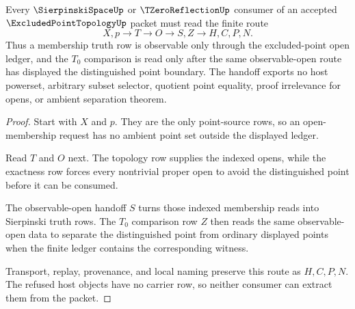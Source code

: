 \begin{theorem}
\label{thm:excluded-point-topology-sierpinski-handoff}
Every $\SierpinskiSpaceUp$ or $\TZeroReflectionUp$ consumer of an accepted $\ExcludedPointTopologyUp$ packet must read the finite route
$$
X,p \longrightarrow T \longrightarrow O \longrightarrow S,Z \longrightarrow H,C,P,N .
$$
Thus a membership truth row is observable only through the excluded-point open ledger, and the $T_0$ comparison is read only after the same observable-open route has displayed the distinguished point boundary. The handoff exports no host powerset, arbitrary subset selector, quotient point equality, proof irrelevance for opens, or ambient separation theorem.
\end{theorem}
\begin{proof}
Start with $X$ and $p$. They are the only point-source rows, so an open-membership request has no ambient point set outside the displayed ledger.

Read $T$ and $O$ next. The topology row supplies the indexed opens, while the exactness row forces every nontrivial proper open to avoid the distinguished point before it can be consumed.

The observable-open handoff $S$ turns those indexed membership reads into Sierpinski truth rows. The $T_0$ comparison row $Z$ then reads the same observable-open data to separate the distinguished point from ordinary displayed points when the finite ledger contains the corresponding witness.

Transport, replay, provenance, and local naming preserve this route as $H,C,P,N$. The refused host objects have no carrier row, so neither consumer can extract them from the packet.
\end{proof}



